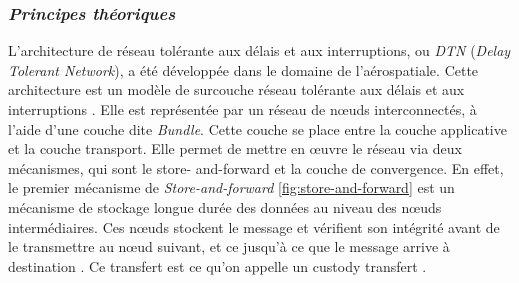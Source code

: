 \documentclass[conference]{IEEEtran}
\begin{document}
\subsubsection{\textbf{\textit{Principes théoriques}}}
L'architecture de réseau tolérante aux délais et aux interruptions, ou \emph{DTN} (\emph{Delay Tolerant Network}), a été développée dans le domaine de l'aérospatiale.  Cette architecture est un modèle de surcouche réseau tolérante aux délais et aux interruptions \cite{b5}. Elle est représentée par un réseau de nœuds interconnectés, à l’aide d’une couche dite \emph{Bundle}. Cette couche se place entre la couche applicative et la couche transport. Elle permet de mettre en œuvre le réseau via deux mécanismes, qui sont le store- and-forward et la couche de convergence.
\newline En effet, le premier mécanisme de \emph{Store-and-forward} \autoref{fig:store-and-forward} est un mécanisme de stockage longue durée des données au niveau des nœuds intermédiaires. Ces nœuds stockent le message et vérifient son intégrité avant de le transmettre au nœud suivant, et ce jusqu’à ce que le message arrive à destination \cite{b6}. Ce transfert est ce qu’on appelle un custody transfert \cite{b7}. 
\end{document}
